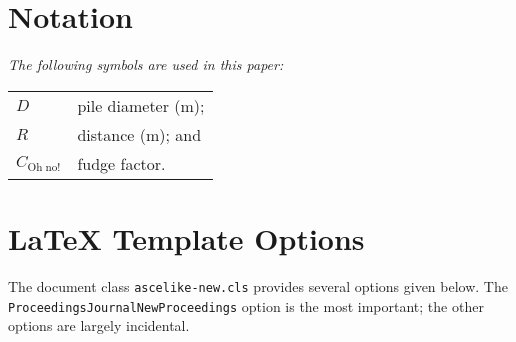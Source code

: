 \documentclass[
  NewProceedings,
  letterpaper]{./assets/ascelike-new}
\begin{document}
\appendix

\hypertarget{sec-app-notation}{%
\section{Notation}\label{sec-app-notation}}

\emph{The following symbols are used in this paper:}

\begin{longtable}[]{@{}ll@{}}
\toprule()
\endhead
\(D\) & pile diameter (m); \\
\(R\) & distance (m); and \\
\(C_{\mathrm{Oh\;no!}}\) & fudge factor. \\
\bottomrule()
\end{longtable}

\hypertarget{sec-app-options}{%
\section{LaTeX Template Options}\label{sec-app-options}}

The document class \texttt{ascelike-new.cls} provides several options
given below. The
\texttt{Proceedings\textbar{}\textasciigrave{}\textasciigrave{}Journal\textbar{}\textasciigrave{}\textasciigrave{}NewProceedings}
option is the most important; the other options are largely incidental.
\end{document}
